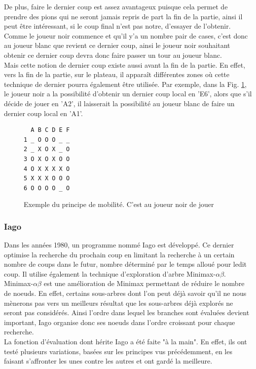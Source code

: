 \documentclass[10pt,a4paper]{article}
\begin{document}
\begin{itemize}
De plus, faire le dernier coup est assez avantageux puisque cela permet de prendre des pions qui ne seront jamais repris de part la fin de la partie, ainsi il peut être intéressant, si le coup final n'est pas notre, d'essayer de l'obtenir. Comme le joueur noir commence et qu'il y'a un nombre pair de cases, c'est donc au joueur blanc que revient ce dernier coup, ainsi le joueur noir souhaitant obtenir ce dernier coup devra donc faire passer un tour au joueur blanc.\\

Mais cette notion de dernier coup existe aussi avant la fin de la partie. En effet, vers la fin de la partie, sur le plateau, il apparaît différentes zones où cette technique de dernier pourra également être utilisée. Par exemple, dans la Fig. \ref{fig:mobilité}, le joueur noir a la possibilité d'obtenir un dernier coup local en 'E6', alors que s'il décide de jouer en 'A2', il laisserait la possibilité au joueur blanc de faire un dernier coup local en 'A1'.
\begin{figure}[H]    
\centering
\begin{BVerbatim}
  A B C D E F
1 _ O O O _ _
2 _ X O X _ O
3 O X O X O O
4 O X X X X O
5 X X X O O O
6 O O O O _ O
\end{BVerbatim}
\caption {Exemple du principe de mobilité. C'est au joueur noir de jouer\label{fig:mobilité}}
\end{figure}
\end{itemize}

\subsubsection {Iago}

Dans les années 1980, un programme nommé Iago\cite{Ros81} est développé. Ce dernier optimise la recherche du prochain coup en limitant la recherche à un certain nombre de coups dans le futur, nombre déterminé par le temps alloué pour ledit coup. Il utilise également la technique d'exploration d'arbre Minimax-$\alpha\beta$. Minimax-$\alpha\beta$ est une amélioration de Minimax permettant de réduire le nombre de noeuds. En effet, certains sous-arbres dont l'on peut déjà savoir qu'il ne nous mènerons pas vers un meilleurs résultat que les sous-arbres déjà explorés ne seront pas considérés. Ainsi l'ordre dans lequel les branches sont évaluées devient important, Iago organise donc ses noeuds dans l'ordre croissant pour chaque recherche.\\

La fonction d'évaluation dont hérite Iago a été faite "à la main". En effet, ils ont testé plusieurs variations, basées sur les principes vus précédemment, en les faisant s'affronter les unes contre les autres et ont gardé la meilleure.
\end{document}
